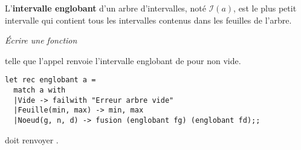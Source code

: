 L'{\bf intervalle englobant} d'un arbre d'intervalles, noté $\mathcal{I}(a)$, est le plus petit 
intervalle  qui contient tous les intervalles contenus dans les feuilles de l'arbre.
\begin{Exercise}\it
Écrire une fonction 

telle que l'appel  renvoie l'intervalle englobant de  pour  non vide.
\end{Exercise}
\begin{Answer}
\begin{lstlisting}
let rec englobant a =
  match a with
  |Vide -> failwith "Erreur arbre vide"
  |Feuille(min, max) -> min, max
  |Noeud(g, n, d) -> fusion (englobant fg) (englobant fd);;
\end{lstlisting}
\end{Answer}
 doit renvoyer .
\medskip

